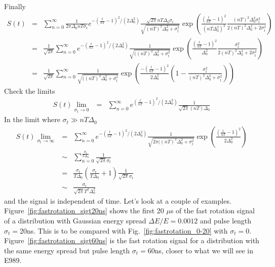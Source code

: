 \documentclass[10pt]{report}
\begin{document}
Finally
\begin{eqnarray}
S(t)&=&\sum_{n=0}^\infty\frac{1}{2\pi\Delta_0nT\sigma_t}e^{-(\frac{t}{nT}-1)^2/(2\Delta_0^2)}
\frac{\sqrt{2\pi}nT\Delta_0\sigma_t}{\sqrt{(nT)^2\Delta_0^2+\sigma_t^2}}
\exp(\frac{(\frac{t}{nT}-1)^2}{(nT\Delta_0^2)^2}\frac{(nT)^2\Delta_0^2\sigma_t^2}{2(nT)^2\Delta_0^2+2\sigma_t^2})\nonumber\\
&=& \frac{1}{\sqrt{2\pi}}\sum_{n=0}^\infty e^{-(\frac{t}{nT}-1)^2/(2\Delta_0^2)}
\frac{1}{\sqrt{((nT)^2\Delta_0^2+\sigma_t^2}}
\exp(\frac{(\frac{t}{nT}-1)^2}{\Delta_0^2}\frac{\sigma_t^2}{2(nT)^2\Delta_0^2+2\sigma_t^2})\nonumber\\
&=& \frac{1}{\sqrt{2\pi}}\sum_{n=0}^\infty
\frac{1}{\sqrt{((nT)^2\Delta_0^2+\sigma_t^2}}
\exp(\frac{-(\frac{t}{nT}-1)^2}{2\Delta_0^2}\left(1-\frac{\sigma_t^2}{(nT)^2\Delta_0^2+\sigma_t^2}\right))\label{eq:frs-sigt}
\end{eqnarray}
Check the limits
\begin{eqnarray*}
S(t)\lim_{\sigma_t\rightarrow 0} &=& \sum_{n=0}^\infty e^{(\frac{t}{nT}-1)^2/(2\Delta_0^2)}
\frac{1}{\sqrt{2\pi}(nT)\Delta_0}
\end{eqnarray*}
In the limit where $\sigma_t \gg nT\Delta_0$
\begin{eqnarray*}
S(t)\lim_{\sigma_t\rightarrow \infty} &=& 
 \sum_{n=0}^\infty e^{-(\frac{t}{nT}-1)^2/(2\Delta_0^2)}
\frac{1}{\sqrt{2\pi((nT)^2\Delta_0^2+\sigma_t^2}}
\exp(\frac{(\frac{t}{nT}-1)^2}{2\Delta_0^2})\\
&\sim& \sum_{n=0}^{\frac{\sigma_t}{T\Delta_0}}
\frac{1}{\sqrt{2\pi}\sigma_t}\\
&=& \frac{\sigma_t}{T\Delta_0}(\frac{\sigma_t}{T\Delta_0} + 1)\frac{1}{\sqrt{2\pi}\sigma_t}\\
&\sim& \frac{\sigma_t}{\sqrt{2\pi}T^2\Delta_0^2}
\end{eqnarray*}
and the signal is independent of time.
Let's look at a couple of examples.
Figure~\ref{fig:fastrotation_sigt20ns} shows the first 20 $\mu$s of the fast rotation signal
of a distribution with Gaussian energy spread $\Delta E/E=0.0012$ and pulse length $\sigma_t=$20ns. This is to 
be compared with Fig.~\ref{fig:fastrotation_0-20} with $\sigma_t=0$. Figure~\ref{fig:fastrotation_sigt60ns} is the fast rotation
signal for a distribution with the same energy spread but pulse length $\sigma_t=60$ns, closer to what we will see in E989. 
\end{document}
